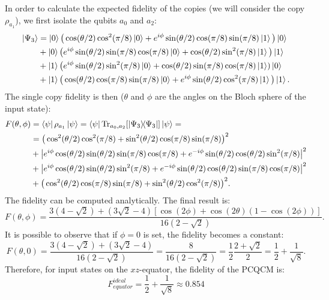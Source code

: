 In order to calculate the expected fidelity of the copies (we will consider the copy $\rho_{a_1}$), we first isolate the qubits $a_0$ and $a_2$:
\[
    \begin{split}
    \ket{\Psi_3}&=\ket{0}\big(\cos(\theta/2)\cos^2(\pi/8)\ket{0}+e^{i\phi}\sin(\theta/2)\cos(\pi/8)\sin(\pi/8)\ket{1}\big)\ket{0}\\
    &+\ket{0}\big(e^{i\phi}\sin(\theta/2)\sin(\pi/8)\cos(\pi/8)\ket{0}+\cos(\theta/2)\sin^2(\pi/8)\ket{1}\big)\ket{1}\\
    &+\ket{1}\big(e^{i\phi}\sin(\theta/2)\sin^2(\pi/8)\ket{0}+\cos(\theta/2)\sin(\pi/8)\cos(\pi/8)\ket{1})\ket{0}\\
    &+\ket{1}\big(\cos(\theta/2)\cos(\pi/8)\sin(\pi/8)\ket{0}+e^{i\phi}\sin(\theta/2)\cos^2(\pi/8)\ket{1}\big)\ket{1}.
    \end{split}
\]
The single copy fidelity is then ($\theta$ and $\phi$ are the angles on the Bloch sphere of the input state):
\[
    \begin{split}
    F(\theta,\phi)&=\bra{\psi}\rho_{a_1}\ket{\psi}=\bra{\psi}\Tr_{a_0,a_2}[\ketbra{\Psi_3}]\ket{\psi}=\\
    &=\big(\cos^2(\theta/2)\cos^2(\pi/8)+\sin^2(\theta/2)\cos(\pi/8)\sin(\pi/8)\big)^2\\
    &+\big|e^{i\phi}\cos(\theta/2)\sin(\theta/2)\sin(\pi/8)\cos(\pi/8)+e^{-i\phi}\sin(\theta/2)\cos(\theta/2)\sin^2(\pi/8)\big|^2\\
    &+\big|e^{i\phi}\cos(\theta/2)\sin(\theta/2)\sin^2(\pi/8)+e^{-i\phi}\sin(\theta/2)\cos(\theta/2)\sin(\pi/8)\cos(\pi/8)\big|^2\\
    &+\big(\cos^2(\theta/2)\cos(\pi/8)\sin(\pi/8)+\sin^2(\theta/2)\cos^2(\pi/8)\big)^2.
    \end{split}
\]
The fidelity can be computed analytically. The final result is:
\[
    F(\theta,\phi)=\frac{3\left(4-\sqrt{2}\right)+\left(3\sqrt{2}-4\right)\left[\cos(2\phi)+\cos(2\theta)\left(1-\cos(2\phi)\right)\right]}{     16(2-\sqrt{2})   }.
\]
It is possible to observe that if $\phi=0$ is set, the fidelity becomes a constant:
\[
    F(\theta,0)=\frac{3\left(4-\sqrt{2}\right)+\left(3\sqrt{2}-4\right)}{16(2-\sqrt{2})}=\frac{8}{16(2-\sqrt{2})}=\frac{1}{2}\frac{2+\sqrt{2}}{2}=\frac{1}{2}+\frac{1}{\sqrt{8}}.
\]
Therefore, for input states on the $xz$-equator, the fidelity of the PCQCM is:
\begin{equation}
    F_{equator}^{ideal}=\frac{1}{2}+\frac{1}{\sqrt{8}}\approx 0.854
\end{equation}


